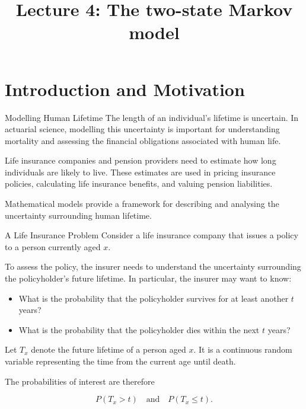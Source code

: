 \documentclass[
  ignorenonframetext,
  aspectratio=169,
]{beamer}
\title{\texorpdfstring{Lecture 4: The two-state Markov
model}{Lecture 4: The two-state Markov model}}
\author{}
\date{}
\providecommand{\tightlist}{%
  \setlength{\itemsep}{0pt}\setlength{\parskip}{0pt}}
\begin{document}
\frame{\titlepage}


\section{Introduction and Motivation}\label{introduction-and-motivation}

\begin{frame}{Modelling Human Lifetime}
\protect{}\label{modelling-human-lifetime}
The length of an individual's lifetime is uncertain. In actuarial
science, modelling this uncertainty is important for understanding
mortality and assessing the financial obligations associated with human
life.

Life insurance companies and pension providers need to estimate how long
individuals are likely to live. These estimates are used in pricing
insurance policies, calculating life insurance benefits, and valuing
pension liabilities.

Mathematical models provide a framework for describing and analysing the
uncertainty surrounding human lifetime.
\end{frame}

\begin{frame}{A Life Insurance Problem}
\protect{}\label{a-life-insurance-problem}
Consider a life insurance company that issues a policy to a person
currently aged \(x\).

To assess the policy, the insurer needs to understand the uncertainty
surrounding the policyholder's future lifetime. In particular, the
insurer may want to know:

\begin{itemize}
\tightlist
\item
  What is the probability that the policyholder survives for at least
  another \(t\) years?
\item
  What is the probability that the policyholder dies within the next
  \(t\) years?
\end{itemize}

Let \(T_x\) denote the future lifetime of a person aged \(x\). It is a
continuous random variable representing the time from the current age
until death.

The probabilities of interest are therefore

\[
P(T_x>t)
\quad\text{and}\quad
P(T_x\leq t).
\]
\end{frame}
\end{document}
